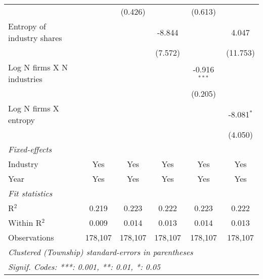 \begin{tabular}{lccccc}
                                             &                 & (0.426)         &                 & (0.613)         &   \\   
   Entropy of industry shares                &                 &                 & -8.844          &                 & 4.047\\   
                                             &                 &                 & (7.572)         &                 & (11.753)\\   
   Log N firms X N industries                &                 &                 &                 & -0.916$^{***}$  &   \\   
                                             &                 &                 &                 & (0.205)         &   \\   
   Log N firms X entropy                     &                 &                 &                 &                 & -8.081$^{*}$\\   
                                             &                 &                 &                 &                 & (4.050)\\   
   \midrule
   \emph{Fixed-effects}\\
   Industry                                  & Yes             & Yes             & Yes             & Yes             & Yes\\  
   Year                                      & Yes             & Yes             & Yes             & Yes             & Yes\\  
   \midrule
   \emph{Fit statistics}\\
   R$^2$                                     & 0.219           & 0.223           & 0.222           & 0.223           & 0.222\\  
   Within R$^2$                              & 0.009           & 0.014           & 0.013           & 0.014           & 0.013\\  
   Observations                              & 178,107         & 178,107         & 178,107         & 178,107         & 178,107\\  
   \midrule \midrule
   \multicolumn{6}{l}{\emph{Clustered (Township) standard-errors in parentheses}}\\
   \multicolumn{6}{l}{\emph{Signif. Codes: ***: 0.001, **: 0.01, *: 0.05}}\\
\end{tabular}
\par\endgroup
